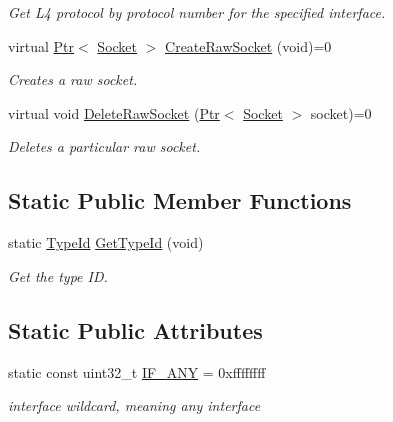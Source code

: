 \begin{DoxyCompactItemize}
\begin{DoxyCompactList}\small\item\em Get L4 protocol by protocol number for the specified interface. \end{DoxyCompactList}\item 
virtual \hyperlink{classns3_1_1Ptr}{Ptr}$<$ \hyperlink{classns3_1_1Socket}{Socket} $>$ \hyperlink{classns3_1_1Ipv4_a1356d5645420ef3270bf27e839605f76}{Create\+Raw\+Socket} (void)=0
\begin{DoxyCompactList}\small\item\em Creates a raw socket. \end{DoxyCompactList}\item 
virtual void \hyperlink{classns3_1_1Ipv4_a1fb3d05138c4767db2c8c1c524ca3db3}{Delete\+Raw\+Socket} (\hyperlink{classns3_1_1Ptr}{Ptr}$<$ \hyperlink{classns3_1_1Socket}{Socket} $>$ socket)=0
\begin{DoxyCompactList}\small\item\em Deletes a particular raw socket. \end{DoxyCompactList}\end{DoxyCompactItemize}
\subsection*{Static Public Member Functions}
\begin{DoxyCompactItemize}
\item 
static \hyperlink{classns3_1_1TypeId}{Type\+Id} \hyperlink{classns3_1_1Ipv4_a339a61fc36efb3366dd2065e5f5f4aa8}{Get\+Type\+Id} (void)
\begin{DoxyCompactList}\small\item\em Get the type ID. \end{DoxyCompactList}\end{DoxyCompactItemize}
\subsection*{Static Public Attributes}
\begin{DoxyCompactItemize}
\item 
static const uint32\+\_\+t \hyperlink{classns3_1_1Ipv4_a9b05b2610976f8d53da45d95891a0657}{I\+F\+\_\+\+A\+NY} = 0xffffffff
\begin{DoxyCompactList}\small\item\em interface wildcard, meaning any interface \end{DoxyCompactList}\end{DoxyCompactItemize}

